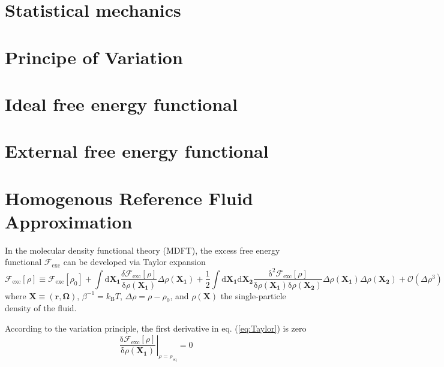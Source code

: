 \section{Statistical mechanics}


\section{Principe of Variation}


\section{Ideal free energy functional}


\section{External free energy functional}


\section{Homogenous Reference Fluid Approximation}

In the molecular density functional theory (MDFT), the excess free
energy functional $\mathcal{F}_{\mathrm{exc}}$ can be developed via
Taylor expansion 
\begin{equation}
\mathcal{F}_{\mathrm{exc}}\left[\rho\right]\equiv\mathcal{F}_{\mathrm{exc}}\left[\rho_{0}\right]+\int\mathrm{d}\mathbf{X_{1}}\frac{\delta\mathcal{F}_{\mathrm{exc}}\left[\rho\right]}{\mathrm{\delta}\rho(\mathbf{X_{1}})}\Delta\rho(\mathbf{X_{1}})+\frac{1}{2}\int\mathrm{d}\mathbf{X_{1}}\mathrm{d}\mathbf{X_{2}}\frac{\mathrm{\delta}^{2}\mathcal{F}_{\mathrm{exc}}\left[\rho\right]}{\mathrm{\delta}\rho(\mathbf{X_{1}})\mathrm{\delta}\rho(\mathbf{X_{2}})}\Delta\rho(\mathbf{X_{1}})\Delta\rho(\mathbf{X_{2}})+\mathcal{O}(\Delta\rho^{3})\label{eq:Taylor}
\end{equation}
where $\mathbf{X}\equiv(\mathbf{r},\mathbf{\Omega})$, $\beta^{-1}=k_{\mathrm{B}}T$,
$\Delta\rho=\rho-\rho_{0}$, and $\rho(\mathbf{X})$ the single-particle
density of the fluid.

According to the variation principle, the first derivative in eq.
(\ref{eq:Taylor}) is zero
\begin{equation}
\left.\frac{\mathrm{\delta}\mathcal{F}_{\mathrm{exc}}\left[\rho\right]}{\mathrm{\delta}\rho(\mathbf{X_{1}})}\right|_{\rho=\rho_{\mathrm{eq}}}=0
\end{equation}


